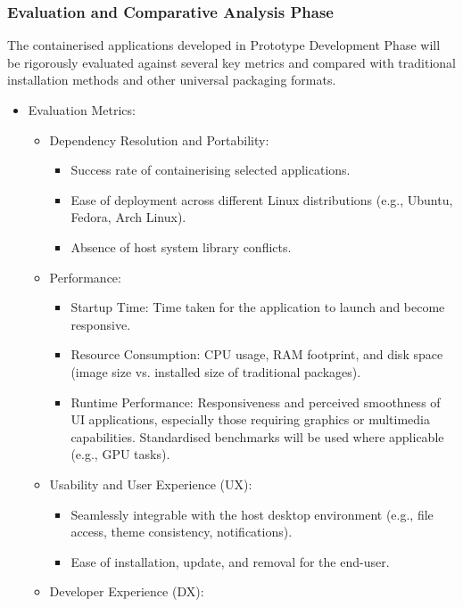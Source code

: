\documentclass[journal,onecolumn]{IEEEtran}
\begin{document}
\subsubsection{Evaluation and Comparative Analysis Phase}

The containerised applications developed in Prototype Development Phase will be rigorously evaluated against several key metrics and compared with traditional installation methods and other universal packaging formats.
\begin{itemize}
    \item Evaluation Metrics:
    \begin{itemize}
        \item Dependency Resolution and Portability:
        \begin{itemize}
            \item Success rate of containerising selected applications.
            \item Ease of deployment across different Linux distributions (e.g., Ubuntu, Fedora, Arch Linux).
            \item Absence of host system library conflicts.
        \end{itemize}
        \item Performance:
        \begin{itemize}
            \item Startup Time: Time taken for the application to launch and become responsive.
            \item Resource Consumption: CPU usage, RAM footprint, and disk space (image size vs. installed size of traditional packages).
            \item Runtime Performance: Responsiveness and perceived smoothness of UI applications, especially those requiring graphics or multimedia capabilities. Standardised benchmarks will be used where applicable (e.g., GPU tasks).
        \end{itemize}
        \item Usability and User Experience (UX):
        \begin{itemize}
            \item Seamlessly integrable with the host desktop environment (e.g., file access, theme consistency, notifications).
            \item Ease of installation, update, and removal for the end-user.
        \end{itemize}
        \item Developer Experience (DX):

\end{itemize}
\end{itemize}
\end{document}
